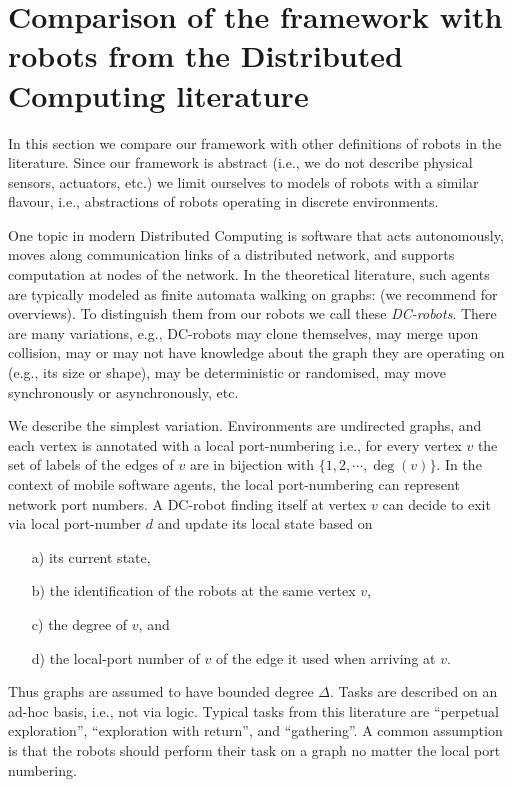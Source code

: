 \section{Comparison of the framework with robots from the Distributed Computing literature} \label{sec:illustration}




In this section we compare our framework with other definitions of robots in the literature. Since our framework is abstract (i.e., we do not describe physical sensors, actuators, etc.) we limit ourselves to models of robots with a similar flavour, i.e., abstractions of robots operating in discrete environments.

One topic in modern Distributed Computing is software that acts autonomously, moves along communication links of a distributed network, and supports 
computation at nodes of the network. In the theoretical literature, such agents are typically modeled as finite automata walking on graphs: \cite{FIPPP04,Diks200438,Cohen05graphexploration,KKR06,GR08,DBLP:conf/wdag/FraigniaudP08,Das13,DBLP:conf/wdag/ChalopinGN15} (we recommend \cite{KKR06,Das13} for overviews). To distinguish them from our robots we call these \emph{DC-robots}. There are many variations, e.g., DC-robots may clone themselves, may merge upon collision, may or may not have knowledge about the graph they are operating on (e.g., its size or shape), may be deterministic or randomised, may move synchronously or asynchronously, etc.

We describe the simplest variation. Environments are undirected graphs, and each vertex is annotated with a local port-numbering i.e., for every vertex $v$ the set of labels of the edges of $v$ are in bijection with $\{1,2,\cdots,\deg(v)\}$. In the context of mobile software agents, the local port-numbering can represent network port numbers.
A DC-robot finding itself at vertex $v$ can decide to exit via local port-number $d$ and update its local state based on 
\begin{enumerate}
\item[a)] its current state, 
\item[b)] the identification of the robots at the same vertex $v$, 
\item[c)] the degree of $v$, and 
\item[d)] the local-port number of $v$ of the edge it used when arriving at $v$. 
\end{enumerate}
Thus graphs are assumed to have bounded degree $\Delta$.
Tasks are described on an ad-hoc basis, i.e., not via logic. Typical tasks from this literature are ``perpetual exploration'', ``exploration with return'', and ``gathering''. A common assumption is that the robots should perform their task on a graph no matter the local port numbering. 


